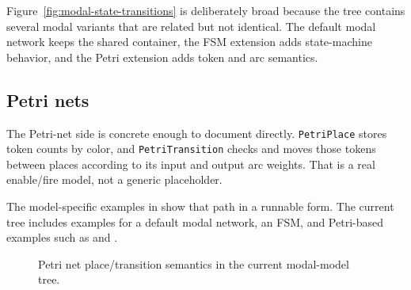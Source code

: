 Figure~\ref{fig:modal-state-transitions} is deliberately broad because the tree
contains several modal variants that are related but not identical. The default
modal network keeps the shared container, the FSM extension adds state-machine
behavior, and the Petri extension adds token and arc semantics.

\subsection{Petri nets}
\label{subsec:petri-nets}

The Petri-net side is concrete enough to document directly. \texttt{PetriPlace}
stores token counts by color, and \texttt{PetriTransition} checks and moves
those tokens between places according to its input and output arc weights.
That is a real enable/fire model, not a generic placeholder.

The model-specific examples in 
show that path in a runnable form. The current tree includes examples for a
default modal network, an FSM, and Petri-based examples such as
 and .

\begin{figure}[htbp]
\centering
\caption{Petri net place/transition semantics in the current modal-model tree.}
\label{fig:petri-net-flow}
\end{figure}

